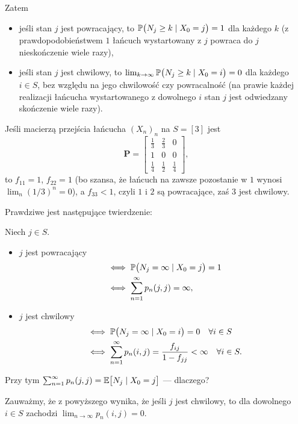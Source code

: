 \documentclass[dvipsnames]{book}
\begin{document}
Zatem
\begin{itemize}[topsep=0pt]
  \item jeśli stan $j$ jest powracający, to
  $\P\big(N_j \geq k \mid X_0 = j\big) = 1$ dla każdego $k$
  (z prawdopodobieństwem $1$ łańcuch wystartowany z $j$ powraca do $j$
  nieskończenie wiele razy),
  \item jeśli stan $j$ jest chwilowy, to
  $\lim_{k \to \infty} \P\big(N_j \geq k \mid X_0 = i\big) = 0$ dla każdego
  $i \in S$, bez względu na jego chwilowość czy powracalność (na prawie każdej
  realizacji łańcucha wystartowanego z dowolnego $i$ stan $j$ jest odwiedzany
  skończenie wiele razy).
\end{itemize}

\begin{przyklad}
Jeśli macierzą przejścia łańcucha $(X_n)_n$ na $S = [3]$ jest
\[
  \mathbf{P} =
  \begin{bmatrix}
    \frac13 & \frac23 & 0 \\
    1 & 0 & 0 \\
    \frac14 & \frac12 & \frac14
  \end{bmatrix},
\]
to $f_{11} = 1$, $f_{22} = 1$ (bo szansa, że łańcuch na zawsze pozostanie w $1$
wynosi $\lim_n (1/3)^n = 0$), a $f_{33} < 1$, czyli $1$ i $2$ są powracające,
zaś $3$ jest chwilowy.
\end{przyklad}

Prawdziwe jest następujące twierdzenie:

\begin{twierdzenie}
Niech $j \in S$.
\begin{itemize}[topsep=0pt,itemsep=0pt]
  \item $j$ jest powracający
  \begin{align*}
    &\iff \P\big(N_j = \infty \mid X_0 = j\big) = 1 \\
    &\iff \sum_{n=1}^{\infty} p_n(j,j) = \infty,
  \end{align*}
  \item $j$ jest chwilowy
  \begin{align*}
    &\iff \P\big(N_j = \infty \mid X_0 = i\big) = 0 \quad \forall i \in S \\
    &\iff \sum_{n=1}^{\infty} p_n(i,j) = \frac{f_{ij}}{1 - f_{jj}} < \infty
      \quad \forall i \in S.
  \end{align*}
\end{itemize}
\end{twierdzenie}

Przy tym $\sum_{n=1}^{\infty} p_n(j,j) = \E\big[N_j \mid X_0 = j\big]$ ---
dlaczego?

Zauważmy, że z powyższego wynika, że jeśli $j$ jest chwilowy, to dla dowolnego
$i \in S$ zachodzi $\lim_{n \to \infty} p_n(i,j) = 0$.
\end{document}
